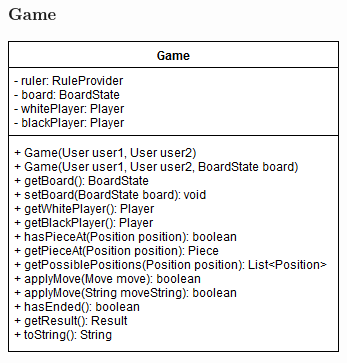 \documentclass[parskip=full]{scrartcl}
\begin{document}
		\subsubsection{Game}
		\begin{minipage}{\linewidth}
			\centering
			\includegraphics[width=1\linewidth]{Diagramme/Game}
			\label{fig:game}
		\end{minipage}
\end{document}
